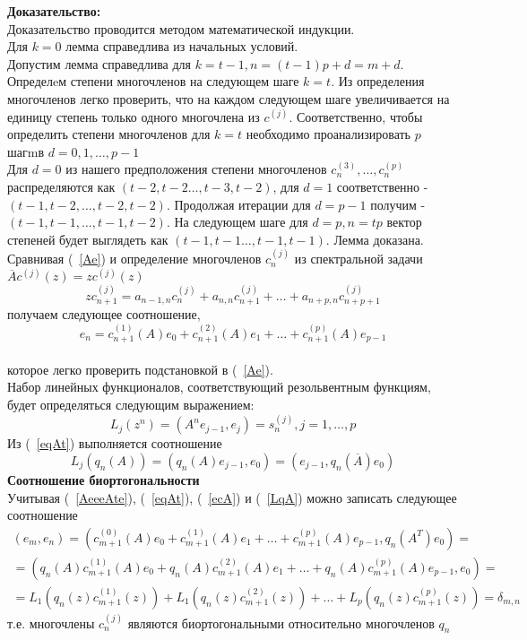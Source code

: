 \textbf{Доказательство:} \\
Доказательство проводится методом математической индукции. \\ Для
$k=0$ лемма справедлива из начальных условий. \\
Допустим лемма справедлива для $k=t-1, n = (t-1)p+d = m+d$.
Определeм степени многочленов на следующем шаге $k=t$. Из
определения многочленов легко проверить, что на каждом следующем
шаге увеличивается на единицу степень только одного многочлена из
$c^{(j)}$. Соответственно, чтобы определить степени многочленов
для $k=t$ необходимо
проанализировать $p$ шагmв $d=0,1,\ldots,p-1$ \\
Для $d=0$ из нашего предположения степени многочленов
$c_n^{(3)},\ldots,c_n^{(p)}$ распределяются как
$(t-2,t-2\ldots,t-3, t-2)$, для $d=1$ соответственно -
$(t-1,t-2,\ldots,t-2,t-2)$. Продолжая итерации для $d=p-1$ получим
- $(t-1,t-1,\ldots,t-1, t-2)$. На следующем шаге для $d=p, n=tp$
вектор степеней будет выглядеть как
$(t-1,t-1\ldots,t-1, t-1)$. Лемма доказана. \\
Сравнивая (~\ref{Ae}) и определение многочленов $c^{(j)}_n$ из
спектральной задачи $\overline{A}c^{(j)}(z)=zc^{(j)}(z)$
$$%
zc^{(j)}_{n+1}=a_{n-1,n}c^{(j)}_{n}+a_{n,n}c^{(j)}_{n+1}+\ldots+a_{n+p,n}c^{(j)}_{n+p+1}
$$%
получаем следующее соотношение,
\begin{equation}
\label{ecA}
e_{n}=c_{n+1}^{(1)}(A)e_0+c_{n+1}^{(2)}(A)e_1+\ldots+c_{n+1}^{(p)}(A)e_{p-1}
\end{equation} \\
которое легко проверить подстановкой в (~\ref{Ae}).\\
Набор линейных функционалов, соответствующий резольвентным
функциям, будет определяться следующим выражением:
$$%
L_j(z^n)=(A^ne_{j-1},e_j)=s_n^{(j)},j=1,\ldots,p
$$%
Из (~\ref{eqAt}) выполняется соотношение
\begin{equation}
\label{LqA}
L_j(q_n(A))=(q_n(A)e_{j-1},e_0)=(e_{j-1},q_n(\overline{A})e_0)
\end{equation}
\textbf{Соотношение биортогональности} \\
Учитывая (~\ref{AeeeAte}), (~\ref{eqAt}), (~\ref{ecA}) и
(~\ref{LqA}) можно записать следующее соотношение \\
\begin{eqnarray}
\label{Bio}
(e_m,e_n)=(c_{m+1}^{(0)}(A)e_0+c_{m+1}^{(1)}(A)e_1+\ldots+c_{m+1}^{(p)}(A)e_{p-1},q_n(A^{T})e_0)=\nonumber\\
=(q_n(A)c_{m+1}^{(1)}(A)e_0+q_n(A)c_{m+1}^{(2)}(A)e_1+\ldots+q_n(A)c_{m+1}^{(p)}(A)e_{p-1},e_0)=\\
=L_1(q_n(z)c_{m+1}^{(1)}(z))+L_1(q_n(z)c_{m+1}^{(2)}(z))+\ldots+L_p(q_n(z)c_{m+1}^{(p)}(z))=\delta_{m,n}\nonumber
\end{eqnarray}
т.е. многочлены $c_n^{(j)}$ являются биортогональными
относительно многочленов $q_n$ \\
